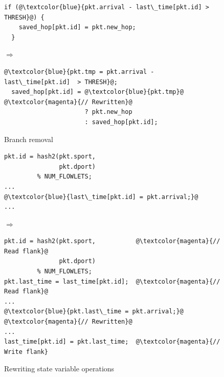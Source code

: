 \begin{figure}[!t]
  \hspace{-0.3in}
  \begin{minipage}{0.55\textwidth}
  \begin{small}
  \begin{lstlisting}[style=customc, numbers=none, frame=none]
  if (@\textcolor{blue}{pkt.arrival - last\_time[pkt.id] > THRESH}@) {
    saved_hop[pkt.id] = pkt.new_hop;
  }
  \end{lstlisting}
  \end{small}
  \end{minipage}
%  
  \hspace{-0.3in}
  $\Longrightarrow$ 
  \hspace{-0.3in}
%  
  \begin{minipage}{0.6\textwidth}
  \begin{small}
  \begin{lstlisting}[style=customc, numbers=none, frame=none]
  @\textcolor{blue}{pkt.tmp = pkt.arrival - last\_time[pkt.id]  > THRESH}@;
  saved_hop[pkt.id] = @\textcolor{blue}{pkt.tmp}@  @\textcolor{magenta}{// Rewritten}@
                      ? pkt.new_hop
                      : saved_hop[pkt.id];
  \end{lstlisting}
  \end{small}
  \end{minipage}
\caption{Branch removal}
\label{fig:if_convert}
\end{figure}

\begin{figure}[!t]
  \begin{minipage}{0.43\textwidth}
  \begin{small}
  \begin{lstlisting}[style=customc, numbers=none, frame=none]
pkt.id = hash2(pkt.sport,
               pkt.dport)
         % NUM_FLOWLETS;
...
@\textcolor{blue}{last\_time[pkt.id] = pkt.arrival;}@
...
  \end{lstlisting}
  \end{small}
  \end{minipage}
%  
  \hspace{-0.5in}
  $\Longrightarrow$ 
  \hspace{-0.2in}
%  
  \begin{minipage}{0.61\textwidth}
  \begin{small}
  \begin{lstlisting}[style=customc, numbers=none, frame=none]
pkt.id = hash2(pkt.sport,           @\textcolor{magenta}{// Read flank}@
               pkt.dport)
         % NUM_FLOWLETS;
pkt.last_time = last_time[pkt.id];  @\textcolor{magenta}{// Read flank}@
...
@\textcolor{blue}{pkt.last\_time = pkt.arrival;}@             @\textcolor{magenta}{// Rewritten}@
...
last_time[pkt.id] = pkt.last_time;  @\textcolor{magenta}{// Write flank}
  \end{lstlisting}
  \end{small}
  \end{minipage}
  \caption{Rewriting state variable operations}
\label{fig:stateful_flanks}
\end{figure}

